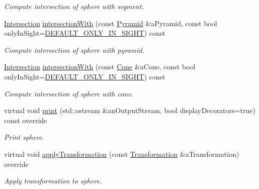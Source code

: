 \begin{DoxyCompactItemize}
\begin{DoxyCompactList}\small\item\em Compute intersection of sphere with segment. \end{DoxyCompactList}\item 
\hyperlink{classostk_1_1math_1_1geom_1_1d3_1_1_intersection}{Intersection} \hyperlink{classostk_1_1math_1_1geom_1_1d3_1_1objects_1_1_sphere_a19df8a41a4853ccf666b8213bed3daf1}{intersection\+With} (const \hyperlink{classostk_1_1math_1_1geom_1_1d3_1_1objects_1_1_pyramid}{Pyramid} \&a\+Pyramid, const bool only\+In\+Sight=\hyperlink{_sphere_8hpp_af424617f7c785f4835e2feba5a5640f2}{D\+E\+F\+A\+U\+L\+T\+\_\+\+O\+N\+L\+Y\+\_\+\+I\+N\+\_\+\+S\+I\+G\+HT}) const
\begin{DoxyCompactList}\small\item\em Compute intersection of sphere with pyramid. \end{DoxyCompactList}\item 
\hyperlink{classostk_1_1math_1_1geom_1_1d3_1_1_intersection}{Intersection} \hyperlink{classostk_1_1math_1_1geom_1_1d3_1_1objects_1_1_sphere_a6a3c2a953d11f6f761207b17e47a6baa}{intersection\+With} (const \hyperlink{classostk_1_1math_1_1geom_1_1d3_1_1objects_1_1_cone}{Cone} \&a\+Cone, const bool only\+In\+Sight=\hyperlink{_sphere_8hpp_af424617f7c785f4835e2feba5a5640f2}{D\+E\+F\+A\+U\+L\+T\+\_\+\+O\+N\+L\+Y\+\_\+\+I\+N\+\_\+\+S\+I\+G\+HT}) const
\begin{DoxyCompactList}\small\item\em Compute intersection of sphere with cone. \end{DoxyCompactList}\item 
virtual void \hyperlink{classostk_1_1math_1_1geom_1_1d3_1_1objects_1_1_sphere_add7bc90c60deddcad6e3486b687a653a}{print} (std\+::ostream \&an\+Output\+Stream, bool display\+Decorators=true) const override
\begin{DoxyCompactList}\small\item\em Print sphere. \end{DoxyCompactList}\item 
virtual void \hyperlink{classostk_1_1math_1_1geom_1_1d3_1_1objects_1_1_sphere_a421357bf4058e68e0aa636f606c6b249}{apply\+Transformation} (const \hyperlink{classostk_1_1math_1_1geom_1_1d3_1_1_transformation}{Transformation} \&a\+Transformation) override
\begin{DoxyCompactList}\small\item\em Apply transformation to sphere. \end{DoxyCompactList}\end{DoxyCompactItemize}
